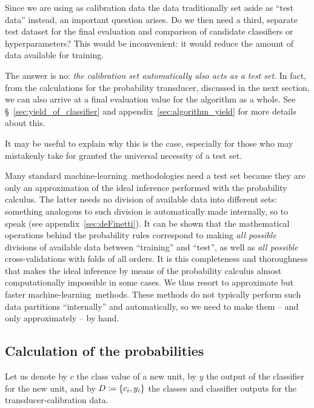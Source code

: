 \documentclass[\ifafour a4paper,12pt,\else a5paper,10pt,\fi%
onecolumn,oneside,article,%
british%
]{memoir}
\theoremstyle{remark}
\theoremstyle{innote}
\newcommand*{\defd}{\coloneqq}
\DeclarePairedDelimiter\set{\{}{\}} %
\renewcommand*{\|}[1][]{\nonscript\:#1\vert\nonscript\:\mathopen{}}
\newcommand*{\sect}{\S}%
\newcommand*{\ml}{machine-learning}
\begin{document}
\medskip

Since we are using as calibration data the data traditionally set aside as \enquote{test data} instead, an important question arises. Do we then need a third, separate test dataset for the final evaluation and comparison of candidate classifiers or hyperparameters? This would be inconvenient: it would reduce the amount of data available for training.

The answer is no: \emph{the calibration set automatically also acts as a test set}. In fact, from the calculations for the probability transducer, discussed in the next section, we can also arrive at a final evaluation value for the algorithm as a whole. See \sect~\ref{sec:yield_of_classifier} and appendix~\ref{sec:algorithm_yield} for more details about this.

It may be useful to explain why this is the case, especially for those who may mistakenly take for granted the universal necessity of a test set.

Many standard \ml\ methodologies need a test set because they are only an approximation of the ideal inference performed with the probability calculus. The latter needs no division of available data into different sets: something analogous to such division is automatically made internally, so to speak (see appendix~\ref{sec:deFinetti}). It can be shown \autocites{portamana2019b,fongetal2020,wald1949}[many examples of this fact are scattered across the text by][]{jaynes1994_r2003} that the mathematical operations behind the probability rules correspond to making \emph{all possible} divisions of available data between \enquote{training} and \enquote{test}, as well as \emph{all possible} cross-validations with folds of all orders. It is this completeness and thoroughness that makes the ideal inference by means of the probability calculus almost computationally impossible in some cases. We thus resort to approximate but faster \ml\ methods. These methods do not typically perform such data partitions \enquote{internally} and automatically, so we need to make them -- and only approximately -- by hand.


\subsection{Calculation of the probabilities}
\label{sec:calculation_transducer}

Let us denote by $c$ the class value of a new unit, by $y$ the output of the classifier for the new unit, and by $D \defd \set{c_{i}, y_{i}}$ the classes and classifier outputs for the transducer-calibration data.
\end{document}
